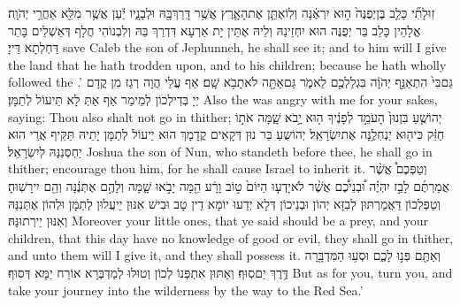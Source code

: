 {זֽוּלָתִ֞י כָּלֵ֤ב בֶּן\maqqaf יְפֻנֶּה֙ ה֣וּא יִרְאֶ֔נָּה וְלֽוֹ\maqqaf אֶתֵּ֧ן אֶת\maqqaf הָאָ֛רֶץ אֲשֶׁ֥ר דָּֽרַךְ\maqqaf בָּ֖הּ וּלְבָנָ֑יו יַ֕עַן אֲשֶׁ֥ר מִלֵּ֖א אַחֲרֵ֥י יְהֹוָֽה׃}
{אֱלָהֵין כָּלֵב בַּר יְפֻנֶּה הוּא יִחְזֵינַהּ וְלֵיהּ אֶתֵּין יָת אַרְעָא דִּדְרַךְ בַּהּ וְלִבְנוֹהִי חֲלָף דְּאַשְׁלֵים בָּתַר דַּחְלְתָא דַּייָ׃}
{save Caleb the son of Jephunneh, he shall see it; and to him will I give the land that he hath trodden upon, and to his children; because he hath wholly followed the \lord.’}{}
{גַּם\maqqaf בִּי֙ הִתְאַנַּ֣ף יְהֹוָ֔ה בִּגְלַלְכֶ֖ם לֵאמֹ֑ר גַּם\maqqaf אַתָּ֖ה לֹא\maqqaf תָבֹ֥א שָֽׁם׃}
{אַף עֲלַי הֲוָה רְגַז מִן קֳדָם יְיָ בְּדִילְכוֹן לְמֵימַר אַף אַתְּ לָא תֵּיעוֹל לְתַמָּן׃}
{Also the \lord\space was angry with me for your sakes, saying: Thou also shalt not go in thither;}{}
{יְהוֹשֻׁ֤עַ בִּן\maqqaf נוּן֙ הָעֹמֵ֣ד לְפָנֶ֔יךָ ה֖וּא יָ֣בֹא שָׁ֑מָּה אֹת֣וֹ חַזֵּ֔ק כִּי\maqqaf ה֖וּא יַנְחִלֶ֥נָּה אֶת\maqqaf יִשְׂרָאֵֽל׃}
{יְהוֹשֻעַ בַּר נוּן דְּקָאֵים קֳדָמָךְ הוּא יֵיעוֹל לְתַמָּן יָתֵיהּ תַּקֵּיף אֲרֵי הוּא יַחְסְנִנַּהּ לְיִשְׂרָאֵל׃}
{Joshua the son of Nun, who standeth before thee, he shall go in thither; encourage thou him, for he shall cause Israel to inherit it.}{}
{וְטַפְּכֶם֩ אֲשֶׁ֨ר אֲמַרְתֶּ֜ם לָבַ֣ז יִהְיֶ֗ה וּ֠בְנֵיכֶ֠ם אֲשֶׁ֨ר לֹא\maqqaf יָדְע֤וּ הַיּוֹם֙ ט֣וֹב וָרָ֔ע הֵ֖מָּה יָבֹ֣אוּ שָׁ֑מָּה וְלָהֶ֣ם אֶתְּנֶ֔נָּה וְהֵ֖ם יִירָשֽׁוּהָ׃}
{וְטַפְלְכוֹן דַּאֲמַרְתּוּן לְבִזָּא יְהוֹן וּבְנֵיכוֹן דְּלָא יְדַעוּ יוֹמָא דֵין טָב וּבִישׁ אִנּוּן יֵיעֲלוּן לְתַמָּן וּלְהוֹן אֶתְּנִנַּהּ וְאִנּוּן יֵירְתוּנַּהּ׃}
{Moreover your little ones, that ye said should be a prey, and your children, that this day have no knowledge of good or evil, they shall go in thither, and unto them will I give it, and they shall possess it.}{}
{וְאַתֶּ֖ם פְּנ֣וּ לָכֶ֑ם וּסְע֥וּ הַמִּדְבָּ֖רָה דֶּ֥רֶךְ יַם\maqqaf סֽוּף׃}
{וְאַתּוּן אִתְפְּנוֹ לְכוֹן וְטוּלוּ לְמַדְבְּרָא אוֹרַח יַמָּא דְּסוּף׃}
{But as for you, turn you, and take your journey into the wilderness by the way to the Red Sea.’}{}

